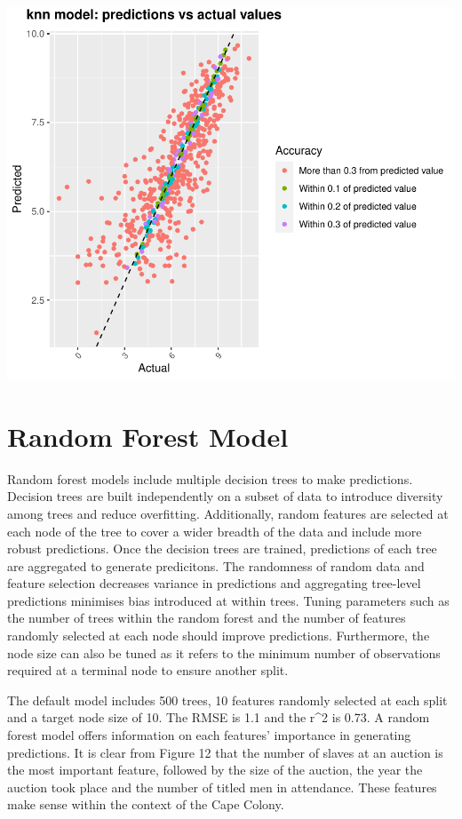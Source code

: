 \documentclass[11pt,preprint, authoryear]{elsarticle}
\numberwithin{equation}{section}
\numberwithin{figure}{section}
\numberwithin{table}{section}
\begin{document}
\includegraphics{Project_write_up_files/figure-latex/Fgiure11-1.pdf}

\hypertarget{random-forest-model}{%
\section{Random Forest Model}\label{random-forest-model}}

Random forest models include multiple decision trees to make
predictions. Decision trees are built independently on a subset of data
to introduce diversity among trees and reduce overfitting. Additionally,
random features are selected at each node of the tree to cover a wider
breadth of the data and include more robust predictions. Once the
decision trees are trained, predictions of each tree are aggregated to
generate predicitons. The randomness of random data and feature
selection decreases variance in predictions and aggregating tree-level
predictions minimises bias introduced at within trees. Tuning parameters
such as the number of trees within the random forest and the number of
features randomly selected at each node should improve predictions.
Furthermore, the node size can also be tuned as it refers to the minimum
number of observations required at a terminal node to ensure another
split.

The default model includes 500 trees, 10 features randomly selected at
each split and a target node size of 10. The RMSE is 1.1 and the r\^{}2
is 0.73. A random forest model offers information on each features'
importance in generating predictions. It is clear from Figure 12 that
the number of slaves at an auction is the most important feature,
followed by the size of the auction, the year the auction took place and
the number of titled men in attendance. These features make sense within
the context of the Cape Colony.
\end{document}
